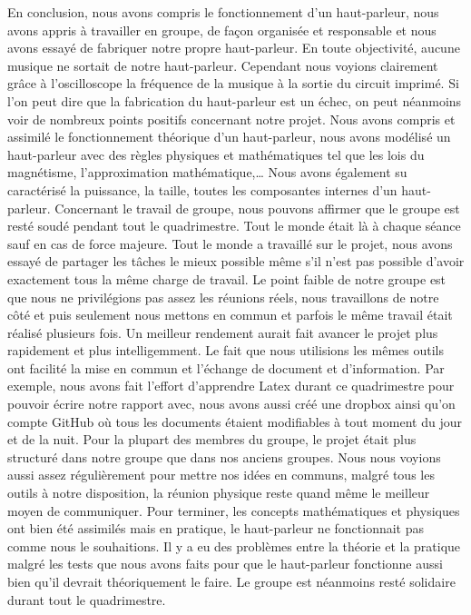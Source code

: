 

En conclusion, nous avons compris le fonctionnement d’un haut-parleur,  nous avons appris à travailler en groupe, de façon organisée et responsable et nous avons essayé de fabriquer notre propre haut-parleur.  En toute objectivité, aucune musique ne sortait de notre haut-parleur.  Cependant nous voyions clairement grâce à l’oscilloscope la fréquence de la musique à la sortie du circuit imprimé.
Si l’on peut dire que la fabrication du haut-parleur est un échec, on peut néanmoins voir de nombreux points positifs concernant notre projet.  Nous avons compris et assimilé le fonctionnement théorique d’un haut-parleur, nous avons modélisé un haut-parleur avec des règles physiques et mathématiques tel que les lois du magnétisme, l’approximation mathématique,…  Nous avons également su caractérisé la puissance, la taille, toutes les composantes internes d’un haut-parleur. 
Concernant le travail de groupe, nous pouvons affirmer que le groupe est resté soudé pendant tout le quadrimestre.  Tout le monde était là à chaque séance sauf en cas de force majeure.  Tout le monde a travaillé sur le projet, nous avons essayé de partager les tâches le mieux possible même s’il n’est pas possible d’avoir exactement tous la même charge de travail.  Le point faible de notre groupe est que nous ne privilégions pas assez les réunions réels, nous travaillons de notre côté et puis seulement nous mettons en commun et parfois le même travail était réalisé plusieurs fois.  Un meilleur rendement aurait fait avancer le projet plus rapidement et plus intelligemment. 
Le fait que nous utilisions les mêmes outils ont facilité la mise en commun et l’échange de document et d’information.  Par exemple, nous avons fait l’effort d’apprendre Latex durant ce quadrimestre pour pouvoir écrire notre rapport avec, nous avons aussi créé une dropbox ainsi qu’on compte GitHub où tous les documents étaient modifiables à tout moment du jour et de la nuit.  Pour la plupart des membres du groupe, le projet était plus structuré dans notre groupe que dans nos anciens groupes.  Nous nous voyions aussi assez régulièrement pour mettre nos idées en communs, malgré tous les outils à notre disposition, la réunion physique reste quand même le meilleur moyen de communiquer.
 Pour terminer, les concepts mathématiques et physiques ont bien été assimilés mais en pratique, le haut-parleur ne fonctionnait pas comme nous le souhaitions.  Il y a eu des problèmes entre la théorie et la pratique malgré les tests que nous avons faits pour que le haut-parleur fonctionne aussi bien qu’il devrait théoriquement le faire.  Le groupe est néanmoins resté solidaire durant tout le quadrimestre.


